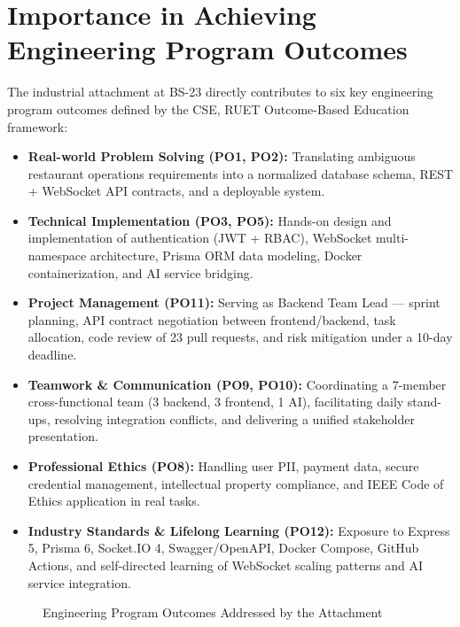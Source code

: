 \section{Importance in Achieving Engineering Program Outcomes}
\label{sec:po}

The industrial attachment at BS-23 directly contributes to six key engineering program outcomes defined by the CSE, RUET Outcome-Based Education framework:

\begin{itemize}
\item \textbf{Real-world Problem Solving (PO1, PO2):} Translating ambiguous restaurant operations requirements into a normalized database schema, REST + WebSocket API contracts, and a deployable system.
\item \textbf{Technical Implementation (PO3, PO5):} Hands-on design and implementation of authentication (JWT + RBAC), WebSocket multi-namespace architecture, Prisma ORM data modeling, Docker containerization, and AI service bridging.
\item \textbf{Project Management (PO11):} Serving as Backend Team Lead --- sprint planning, API contract negotiation between frontend/backend, task allocation, code review of 23 pull requests, and risk mitigation under a 10-day deadline.
\item \textbf{Teamwork \& Communication (PO9, PO10):} Coordinating a 7-member cross-functional team (3 backend, 3 frontend, 1 AI), facilitating daily stand-ups, resolving integration conflicts, and delivering a unified stakeholder presentation.
\item \textbf{Professional Ethics (PO8):} Handling user PII, payment data, secure credential management, intellectual property compliance, and IEEE Code of Ethics application in real tasks.
\item \textbf{Industry Standards \& Lifelong Learning (PO12):} Exposure to Express 5, Prisma 6, Socket.IO 4, Swagger/OpenAPI, Docker Compose, GitHub Actions, and self-directed learning of WebSocket scaling patterns and AI service integration.
\end{itemize}

\begin{figure}[H]
\centering
{}
\caption{Engineering Program Outcomes Addressed by the Attachment}
\label{fig:po}
\end{figure}

